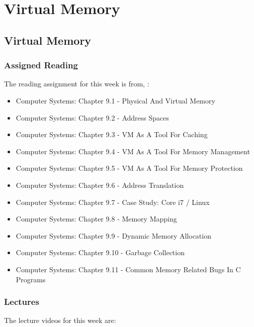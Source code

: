 \clearpage

\renewcommand{\ChapTitle}{Virtual Memory}
\renewcommand{\SectionTitle}{Virtual Memory}

\chapter{\ChapTitle}

\section{\SectionTitle}

\subsection{Assigned Reading}

The reading assignment for this week is from, \Textbook:

\begin{itemize}
    \item Computer Systems: Chapter 9.1 - Physical And Virtual Memory
    \item Computer Systems: Chapter 9.2 - Address Spaces
    \item Computer Systems: Chapter 9.3 - VM As A Tool For Caching
    \item Computer Systems: Chapter 9.4 - VM As A Tool For Memory Management
    \item Computer Systems: Chapter 9.5 - VM As A Tool For Memory Protection
    \item Computer Systems: Chapter 9.6 - Address Translation
    \item Computer Systems: Chapter 9.7 - Case Study: Core i7 / Linux
    \item Computer Systems: Chapter 9.8 - Memory Mapping
    \item Computer Systems: Chapter 9.9 - Dynamic Memory Allocation
    \item Computer Systems: Chapter 9.10 - Garbage Collection
    \item Computer Systems: Chapter 9.11 - Common Memory Related Bugs In C Programs
\end{itemize}

\subsection{Lectures}

The lecture videos for this week are:

